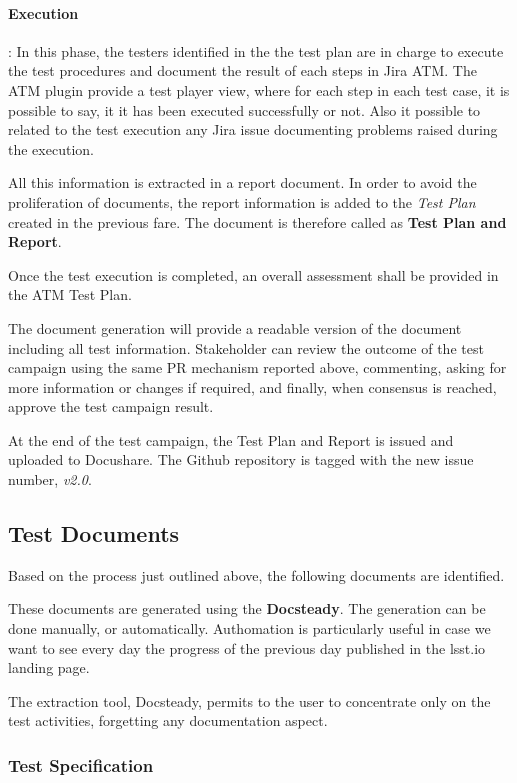 \paragraph{Execution}:
In this phase, the testers identified in the the test plan are in charge to execute the test procedures and 
document the result of each steps in Jira ATM.
The ATM plugin provide a test player view, where for each step in each test case, it is possible to say, it it has been executed successfully or not.
Also it possible to related to the test execution any Jira issue documenting problems raised during the execution.

All this information is extracted in a report document.
In order to avoid the proliferation of documents, the  report information is added to the \textit{Test Plan} created in the previous fare.
The document is therefore called as \textbf{Test Plan and Report}.

Once the test execution is completed, an overall assessment shall be provided in the ATM Test Plan.

The document generation will provide a readable version of the document including all test information.
Stakeholder can review the outcome of the test campaign using the same PR mechanism reported above, 
commenting, asking for more information or changes if required, and finally, when consensus is reached, approve the test campaign result.

At the end of the test campaign, the Test Plan and Report is issued and uploaded to Docushare.
The Github repository is tagged with the new issue number, \textit{v2.0}.


\subsection{Test Documents}

Based on the process just outlined above, the following documents are identified.

These documents are generated using the \textbf{Docsteady}.
The generation can be done manually, or automatically.
Authomation is particularly useful in case we want to see every day the progress of the previous day published in the lsst.io landing page.

The extraction tool, Docsteady, permits to the user to concentrate only on the test activities,
forgetting any documentation aspect.


\subsubsection{Test Specification}

